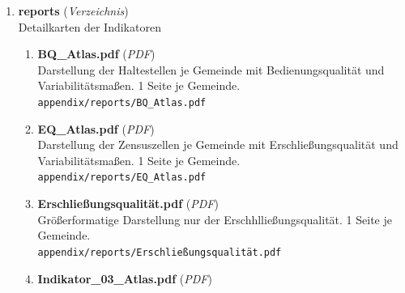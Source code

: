 \begin{enumerate}[label=\arabic*, leftmargin=*, itemsep=0.5em, topsep=0.3em]
\begin{enumerate}[label=\arabic{enumi}.\arabic*, leftmargin=*, itemsep=0.5em, topsep=0.3em]
\begin{enumerate}[label=\arabic{enumi}.\arabic{enumii}.\arabic*, leftmargin=*, itemsep=0.5em, topsep=0.3em]
Anbindungsindikator
\begin{enumerate}[label=\arabic{enumi}.\arabic{enumii}.\arabic{enumiii}.\arabic*, leftmargin=*, itemsep=0.5em, topsep=0.3em]
\item \textbf{hourly} \textnormal{(\textit{Verzeichnis})}\\
Stündliche Entwicklung
\item \textbf{gz} \textnormal{(\textit{Verzeichnis})}\\
99 Vektorgrafiken zur stündlichen Entwicklung der Erschließung zentraler Orte je Gemeinde
\item \textbf{hourly\_tt} \textnormal{(\textit{Verzeichnis})}\\
99 Vektorgrafiken zur stündlichen Entwicklung der Reisezeit in zentrale Orte je Gemeinde
\end{enumerate}
\item \textbf{stop\_routes} \textnormal{(\textit{Verzeichnis})}
\item \textbf{stopvar} \textnormal{(\textit{Verzeichnis})}
\end{enumerate}
\item \textbf{reports} \textnormal{(\textit{Verzeichnis})}\\
Detailkarten der Indikatoren
\begin{enumerate}[label=\arabic{enumi}.\arabic{enumii}.\arabic*, leftmargin=*, itemsep=0.5em, topsep=0.3em]
\item \textbf{BQ\_Atlas.pdf} \textnormal{(\textit{PDF})}\\
Darstellung der Haltestellen je Gemeinde mit Bedienungsqualität und Variabilitätsmaßen. 1 Seite je Gemeinde.\\
\texttt{\small appendix/reports/BQ\_Atlas.pdf}
\item \textbf{EQ\_Atlas.pdf} \textnormal{(\textit{PDF})}\\
Darstellung der Zensuszellen je Gemeinde mit Erschließungsqualität und Variabilitätsmaßen. 1 Seite je Gemeinde.\\
\texttt{\small appendix/reports/EQ\_Atlas.pdf}
\item \textbf{Erschließungsqualität.pdf} \textnormal{(\textit{PDF})}\\
Größerformatige Darstellung nur der Erschhlließungsqualität. 1 Seite je Gemeinde.\\
\texttt{\small appendix/reports/Erschließungsqualität.pdf}
\item \textbf{Indikator\_03\_Atlas.pdf} \textnormal{(\textit{PDF})}\\

\end{enumerate}
\end{enumerate}
\end{enumerate}
